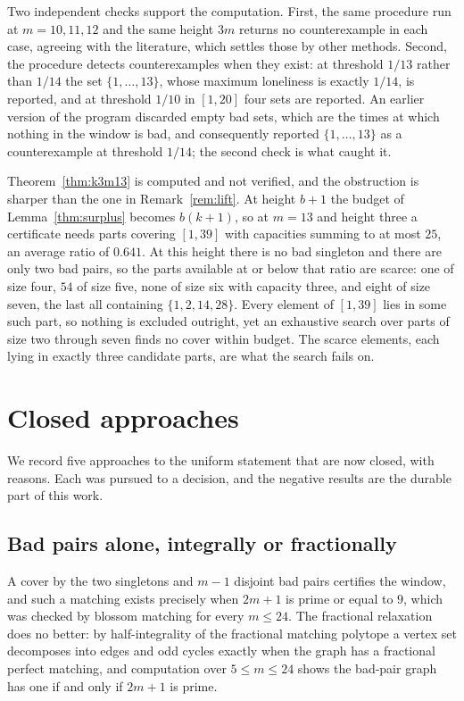 \documentclass[11pt]{amsart}
\theoremstyle{plain}
\theoremstyle{definition}
\begin{document}
Two independent checks support the computation. First, the same procedure run at $m = 10, 11, 12$
and the same height $3m$ returns no counterexample in each case, agreeing with the literature, which
settles those by other methods. Second, the procedure detects counterexamples when they exist: at
threshold $1/13$ rather than $1/14$ the set $\{1,\dots,13\}$, whose maximum loneliness is exactly
$1/14$, is reported, and at threshold $1/10$ in $[1,20]$ four sets are reported. An earlier version
of the program discarded empty bad sets, which are the times at which nothing in the window is bad,
and consequently reported $\{1,\dots,13\}$ as a counterexample at threshold $1/14$; the second check
is what caught it.

Theorem~\ref{thm:k3m13} is computed and not verified, and the obstruction is sharper than the one in
Remark~\ref{rem:lift}. At height $b+1$ the budget of Lemma~\ref{thm:surplus} becomes $b(k+1)$, so
at $m = 13$ and height three a certificate needs parts covering $[1,39]$ with capacities summing to
at most $25$, an average ratio of $0.641$. At this height there is no bad singleton and there are
only two bad pairs, so the parts available at or below that ratio are scarce: one of size four, $54$
of size five, none of size six with capacity three, and eight of size seven, the last all containing
$\{1,2,14,28\}$. Every element of $[1,39]$ lies in some such part, so nothing is excluded outright,
yet an exhaustive search over parts of size two through seven finds no cover within budget. The
scarce elements, each lying in exactly three candidate parts, are what the search fails on.

\section{Closed approaches}\label{sec:obstructions}

We record five approaches to the uniform statement that are now closed, with reasons. Each was
pursued to a decision, and the negative results are the durable part of this work.

\subsection*{Bad pairs alone, integrally or fractionally}
A cover by the two singletons and $m-1$ disjoint bad pairs certifies the window, and such a matching
exists precisely when $2m+1$ is prime or equal to $9$, which was checked by blossom matching for
every $m \le 24$. The fractional relaxation does no better: by half-integrality of the fractional
matching polytope a vertex set decomposes into edges and odd cycles exactly when the graph has a
fractional perfect matching, and computation over $5 \le m \le 24$ shows the bad-pair graph has one
if and only if $2m+1$ is prime.
\end{document}
